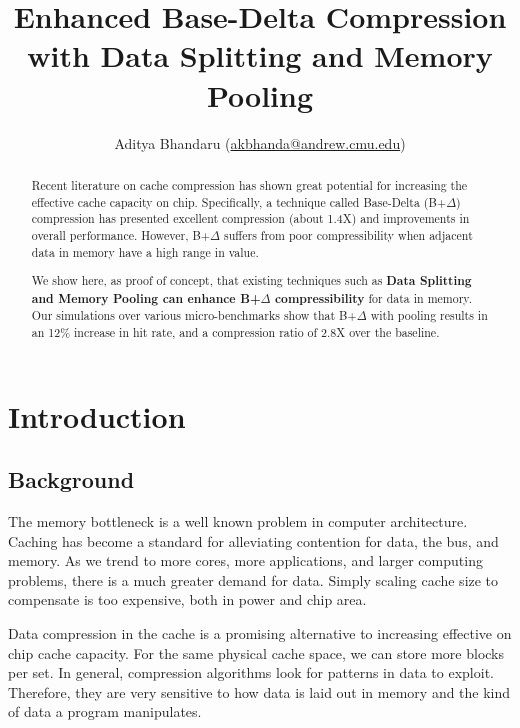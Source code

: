 \documentclass[pageno]{jpaper}
\begin{document}
\title{Enhanced Base-Delta Compression with Data Splitting and Memory Pooling}
\author{Aditya Bhandaru (\href{mailto:akbhanda@andrew.cmu.edu}{akbhanda@andrew.cmu.edu})}
\date{}
\maketitle

\thispagestyle{empty}

\begin{abstract}
Recent literature on cache compression has shown great potential for increasing the effective cache capacity on chip. Specifically, a technique called Base-Delta (B+$\Delta$) compression has presented excellent compression (about 1.4X) and improvements in overall performance. However, B+$\Delta$ suffers from poor compressibility when adjacent data in memory have a high range in value.

We show here, as proof of concept, that existing techniques such as \textbf{Data Splitting and Memory Pooling can enhance B+$\Delta$ compressibility} for data in memory. Our simulations over various micro-benchmarks show that B+$\Delta$ with pooling  results in an 12\% increase in hit rate, and a compression ratio of 2.8X over the baseline.
\end{abstract}

\section{Introduction}

\subsection{Background}

The memory bottleneck is a well known problem in computer architecture. Caching has become a standard for alleviating contention for data, the bus, and memory. As we trend to more cores, more applications, and larger computing problems, there is a much greater demand for data. Simply scaling cache size to compensate is too expensive, both in power and chip area.

Data compression in the cache is a promising alternative to increasing effective on chip cache capacity. For the same physical cache space, we can store more blocks per set. In general, compression algorithms look for patterns in data to exploit. Therefore, they are very sensitive to how data is laid out in memory and the kind of data a program manipulates.
\end{document}
